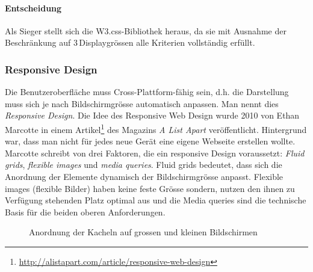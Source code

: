 \paragraph*{Entscheidung}
Als Sieger stellt sich die W3.css-Bibliothek heraus, da sie mit Ausnahme der Beschränkung auf 3\,Displaygrössen alle Kriterien vollständig erfüllt.


\subsubsection{Responsive Design}
\label{subsec:responsiveFactors}
Die Benutzeroberfläche muss Cross-Plattform-fähig sein, d.h. die Darstellung muss sich je nach Bildschirmgrösse automatisch anpassen. Man nennt dies \textit{Responsive Design}. Die Idee des Responsive Web Design wurde 2010 von Ethan Marcotte in einem Artikel\footnote{ \url{http://alistapart.com/article/responsive-web-design}} des Magazins \textit{A List Apart} veröffentlicht. Hintergrund war, dass man nicht für jedes neue Gerät eine eigene Webseite erstellen wollte. Marcotte schreibt von drei Faktoren, die ein responsive Design voraussetzt: \textit{Fluid grids}, \textit{flexible images} und \textit{media queries}. Fluid grids bedeutet, dass sich die Anordnung der Elemente dynamisch der Bildschirmgrösse anpasst. Flexible images (flexible Bilder) haben keine feste Grösse sondern, nutzen den ihnen zu Verfügung stehenden Platz optimal aus und die Media queries sind die technische Basis für die beiden oberen Anforderungen.

\begin{figure}[h!]
	\centering
	\caption{Anordnung der Kacheln auf grossen und kleinen Bildschirmen}
	\label{img:kacheln2}
\end{figure}

